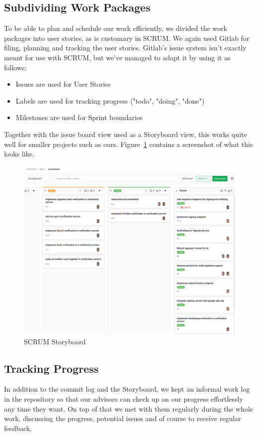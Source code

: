 \subsection{Subdividing Work Packages}\label{subsec:subdividing-work-packages}
To be able to plan and schedule our work efficiently,
we divided the work packages into user stories,
as is customary in SCRUM.
We again used Gitlab for filing, planning and tracking the user stories.
Gitlab's issue system isn't exactly meant for use with SCRUM,
but we've managed to adapt it by using it as follows:
\begin{itemize}
    \item Issues are used for User Stories
    \item Labels are used for tracking progress ("todo", "doing", "done")
    \item Milestones are used for Sprint boundaries
\end{itemize}
Together with the issue board view used as a Storyboard view,
this works quite well for smaller projects such as ours.
Figure~\ref{fig:scrumboard} contains a screenshot of what this looks like.

\begin{figure}
    \begin{center}
        \includegraphics[width=0.8\linewidth]{images/board.png}
        \caption{SCRUM Storyboard}
        \label{fig:scrumboard}
    \end{center}
\end{figure}

\subsection{Tracking Progress}\label{subsec:tracking-progress}
In addition to the commit log and the Storyboard,
we kept an informal work log in the repository so that our advisors can check up on our progress effortlessly
any time they want.
On top of that we met with them regularly during the whole work,
discussing the progress, potential issues and of course to receive regular feedback.

